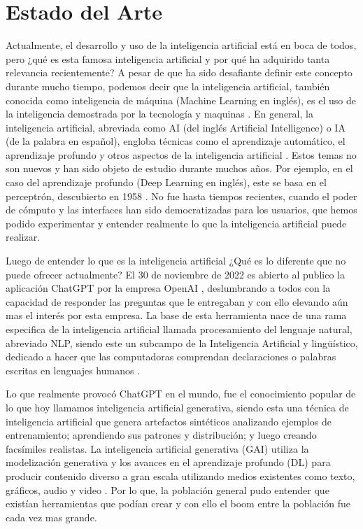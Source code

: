 
\chapter{Estado del Arte}


\par Actualmente, el desarrollo y uso de la inteligencia artificial está en boca de todos, pero ¿qué es esta famosa 
inteligencia artificial y por qué ha adquirido tanta relevancia recientemente? A pesar de que ha sido desafiante
definir este concepto durante mucho tiempo, podemos decir que la inteligencia artificial, también conocida 
como inteligencia de máquina (Machine Learning en inglés), es el uso de la inteligencia demostrada por la 
tecnología y maquinas \cite{mt1}. En general, la inteligencia artificial, abreviada como AI (del inglés Artificial Intelligence) 
o IA (de la palabra en español), engloba técnicas como el aprendizaje automático, el aprendizaje profundo y
otros aspectos de la inteligencia artificial \cite{mt1}. Estos temas no son nuevos y han sido objeto de estudio durante 
muchos años. Por ejemplo, en el caso del aprendizaje profundo (Deep Learning en inglés), este se basa en el 
perceptrón, descubierto en 1958 \cite{perceptron}. No fue hasta tiempos recientes, cuando el poder de cómputo y las interfaces 
han sido democratizadas para los usuarios, que hemos podido experimentar y entender realmente lo que la 
inteligencia artificial puede realizar.


\par Luego de entender lo que es la inteligencia artificial ¿Qué es lo diferente que no puede ofrecer actualmente? 
El 30 de noviembre de 2022 es abierto al publico la aplicación ChatGPT por la empresa OpenAI \cite{mt3}, deslumbrando a todos 
con la capacidad de responder las preguntas que le entregaban y con ello elevando aún mas el interés por esta empresa.
La base de esta herramienta nace de una rama especifica de la inteligencia artificial llamada procesamiento del lenguaje 
natural, abreviado NLP, siendo este un subcampo de la Inteligencia Artificial y lingüístico, dedicado a hacer que las 
computadoras comprendan declaraciones o palabras escritas en lenguajes humanos \cite{nlpeda}.


\par Lo que realmente provocó ChatGPT en el mundo, fue el conocimiento popular de lo que hoy llamamos inteligencia 
artificial generativa, siendo esta una técnica de inteligencia artificial que genera artefactos sintéticos analizando 
ejemplos de entrenamiento; aprendiendo sus patrones y distribución; y luego creando facsímiles realistas. La inteligencia 
artificial generativa (GAI) utiliza la modelización generativa y los avances en el aprendizaje profundo (DL) para producir 
contenido diverso a gran escala utilizando medios existentes como texto, gráficos, audio y video \cite{mt2}. Por lo que, la población 
general pudo entender que existían herramientas que podían crear y con ello el boom entre la población fue cada vez mas grande. 

